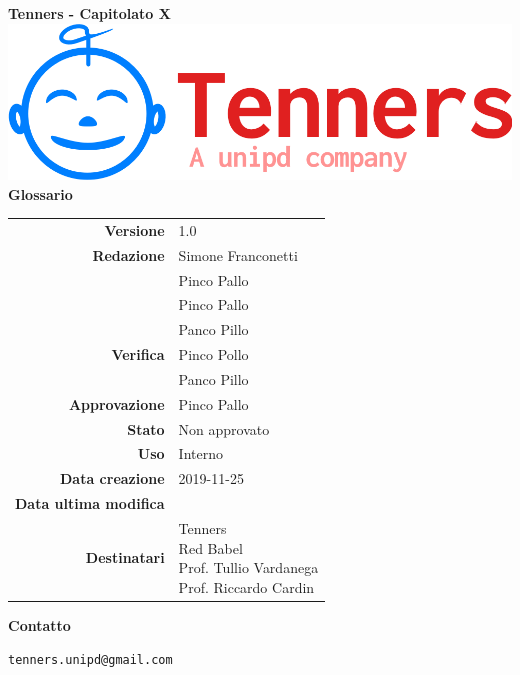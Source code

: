 \begin{titlepage}
	\begin{center}
		\large \textbf{Tenners - Capitolato X}
		\vfill
		\includegraphics[scale = 0.3]{./res/img/logo.png}\\
		\vfill
		\Huge \textbf{Glossario}

        \vfill
        \large

        \begin{tabular}{r|l}
                        \textbf{Versione} & 1.0 \\
                        \textbf{Redazione} &
                        Simone Franconetti\\&
                        Pinco Pallo \\&
                        Pinco Pallo \\&
                        Panco Pillo \\
                        \textbf{Verifica} & 
                        Pinco Pollo \\&
                        Panco Pillo \\
                        \textbf{Approvazione} & Pinco Pallo \\
                        \textbf{Stato} & Non approvato \\
                        \textbf{Uso} &  Interno\\
                        \textbf{Data creazione} &  2019-11-25\\
                        \textbf{Data ultima modifica} &  \\
                        \textbf{Destinatari} & \parbox[t]{5cm}{Tenners \\ Red Babel \\ Prof. Tullio Vardanega\\Prof. Riccardo Cardin}
                \end{tabular}
                \vfill
                \normalsize
                \vfill
                \textbf{Contatto}
                
                \texttt{tenners.unipd@gmail.com}

	\end{center}
\end{titlepage}